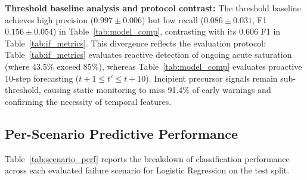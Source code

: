 \documentclass[conference]{IEEEtran}
\begin{document}
\textbf{Threshold baseline analysis and protocol contrast:} The threshold baseline achieves high precision ($0.997 \pm 0.006$) but low recall ($0.086 \pm 0.031$, F1 $0.156 \pm 0.054$) in Table~\ref{tab:model_comp}, contrasting with its 0.606 F1 in Table~\ref{tab:if_metrics}. This divergence reflects the evaluation protocol: Table~\ref{tab:if_metrics} evaluates reactive detection of ongoing acute saturation (where 43.5\% exceed 85\%), whereas Table~\ref{tab:model_comp} evaluates proactive 10-step forecasting ($t+1 \le t' \le t+10$). Incipient precursor signals remain sub-threshold, causing static monitoring to miss 91.4\% of early warnings and confirming the necessity of temporal features.

\subsection{Per-Scenario Predictive Performance}
Table~\ref{tab:scenario_perf} reports the breakdown of classification performance across each evaluated failure scenario for Logistic Regression on the test split.

\begin{table}[htbp]
\centering
\caption{PER-SCENARIO PREDICTIVE PERFORMANCE (LOGISTIC REGRESSION, SEED 42, TEST SPLIT)}
\label{tab:scenario_perf}
\end{table}
\end{document}
